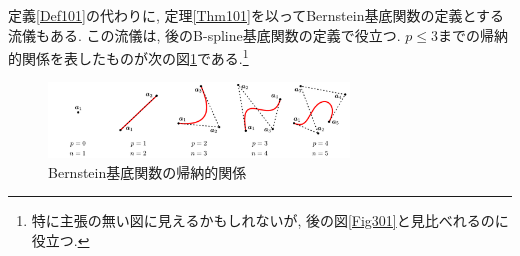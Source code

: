 \documentclass{jsarticle}
\theoremstyle{definition}%
\begin{document}
定義\ref{Def101}の代わりに, 定理\ref{Thm101}を以ってBernstein基底関数の定義とする流儀もある.
この流儀は, 後のB-spline基底関数の定義で役立つ.
$p\le 3$までの帰納的関係を表したものが次の図\ref{Fig102}である.\footnote{特に主張の無い図に見えるかもしれないが, 後の図\ref{Fig301}と見比べれるのに役立つ.}

\begin{figure}[htbp]
	\centering
    \includegraphics[page=2,clip,width=80mm]{fig.pdf}
	\caption{Bernstein基底関数の帰納的関係}
	\label{Fig102}
\end{figure}
\end{document}
